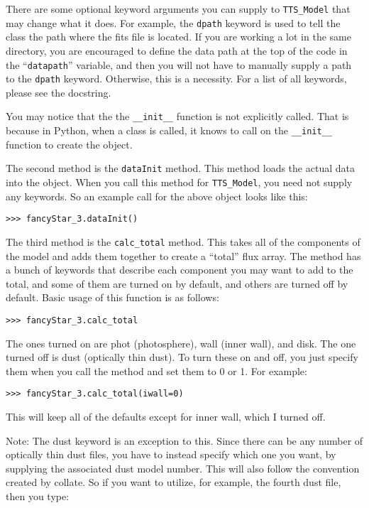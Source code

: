 \documentclass{article}
\begin{document}
\noindent There are some optional keyword arguments you can supply to \texttt{TTS\_Model} that may change what it does. For example, the \texttt{dpath} keyword is used to tell the class the path where the fits file is located. If you are working a lot in the same directory, you are encouraged to define the data path at the top of the code in the “\texttt{datapath}” variable, and then you will not have to manually supply a path to the \texttt{dpath} keyword. Otherwise, this is a necessity. For a list of all keywords, please see the docstring. 
 
You may notice that the the \texttt{\_\_init\_\_} function is not explicitly called. That is because in Python, when a class is called, it knows to call on the \texttt{\_\_init\_\_} function to create the object. 
 
The second method is the \texttt{dataInit} method. This method loads the actual data into the object. When you call this method for \texttt{TTS\_Model}, you need not supply any keywords. So an example call for the above object looks like this: 
 
\vspace{2mm}
\texttt{>>> fancyStar\_3.dataInit()}
\vspace{2mm}

The third method is the \texttt{calc\_total} method. This takes all of the components of the model and adds them together to create a “total” flux array. The method has a bunch of keywords that describe each component you may want to add to the total, and some of them are turned on by default, and others are turned off by default. Basic usage of this function is as follows:

\vspace{2mm}
\texttt{>>> fancyStar\_3.calc\_total}
\vspace{2mm}

\noindent The ones turned on are phot (photosphere), wall (inner wall), and disk. The one turned off is dust (optically thin dust). To turn these on and off, you just specify them when you call the method and set them to 0 or 1. For example: 

\vspace{2mm}
\texttt{>>> fancyStar\_3.calc\_total(iwall=0)}
\vspace{2mm}
 
This will keep all of the defaults except for inner wall, which I turned off. 
 
Note: The dust keyword is an exception to this. Since there can be any number of optically thin dust files, you have to instead specify which one you want, by supplying the associated dust model number. This will also follow the convention created by collate. So if you want to utilize, for example, the fourth dust file, then you type: 
\end{document}

